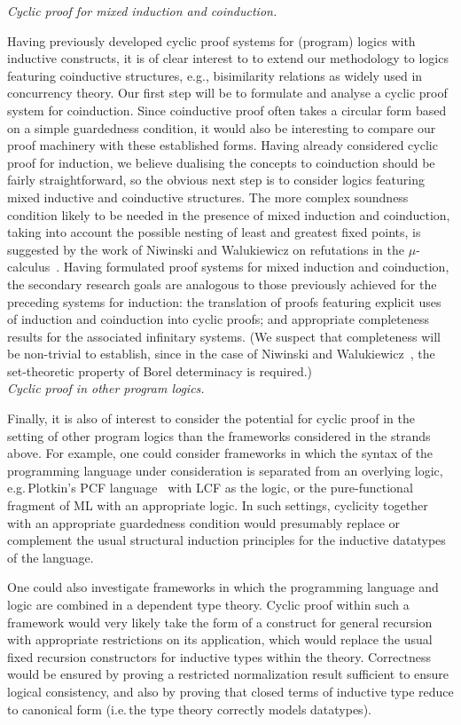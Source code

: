  \emph{Cyclic proof for mixed induction and
coinduction.}

Having previously developed cyclic proof systems for (program)
logics with inductive constructs, it is of clear interest to to
extend our methodology to logics featuring coinductive
structures, e.g., bisimilarity relations as widely used in
concurrency theory.  Our first step will be to formulate and
analyse a cyclic proof system for coinduction.  Since
coinductive proof often takes a circular form based on a simple
guardedness condition, it would also be interesting to compare
our proof machinery with these established forms.  Having
already considered cyclic proof for induction, we believe
dualising the concepts to coinduction should be fairly
straightforward, so the obvious next step is to consider logics
featuring mixed inductive and coinductive structures.  The more
complex soundness condition likely to be needed in the presence
of mixed induction and coinduction, taking into account the
possible nesting of least and greatest fixed points, is
suggested by the work of Niwinski and Walukiewicz on
refutations in the
$\mu$-calculus~\cite{Niwinski-Walukiewicz:97}. Having
formulated proof systems for mixed induction and coinduction,
the secondary research goals are analogous to those previously
achieved for the preceding systems for induction: the
translation of proofs featuring explicit uses of induction and
coinduction into cyclic proofs; and appropriate completeness
results for the associated infinitary systems.  (We suspect
that completeness will be non-trivial to establish, since in
the case of Niwinski and
Walukiewicz~\cite{Niwinski-Walukiewicz:97}, the set-theoretic
property of Borel determinacy is required.)  \\

 \emph{Cyclic proof in other program
logics.}

Finally, it is also of interest to consider the potential for
cyclic proof in the setting of other program logics than the
frameworks considered in the strands above.  For example, one
could consider frameworks in which the syntax of the
programming language under consideration is separated from an
overlying logic, e.g.\,Plotkin's PCF language~\cite{Plotkin:77}
with LCF as the logic, or the pure-functional fragment of ML
with an appropriate logic. In such settings, cyclicity together
with an appropriate guardedness condition would presumably
replace or complement the usual structural induction principles
for the inductive datatypes of the language.

One could also investigate frameworks in which the programming
language and logic are combined in a dependent type theory.
Cyclic proof within such a framework would very likely take the
form of a construct for general recursion with appropriate
restrictions on its application, which would replace the usual
fixed recursion constructors for inductive types within the
theory.  Correctness would be ensured by proving a restricted
normalization result sufficient to ensure logical consistency,
and also by proving that closed terms of inductive type reduce
to canonical form (i.e.\,the type theory correctly models
datatypes).



